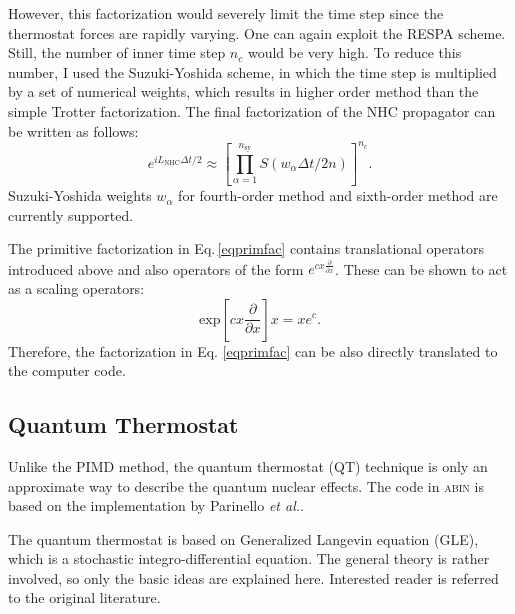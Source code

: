 However, this factorization would severely limit the time step since the thermostat forces are rapidly varying. One can again exploit the RESPA scheme. Still, the number of inner time step $n_c$ would be very high. To reduce this number, I used the Suzuki-Yoshida scheme\cite{Yoshida1990}, in which the time step is multiplied by a set of numerical weights, which results in higher order method than the simple Trotter factorization. 
The final factorization of the NHC propagator can be written as follows:
\begin{equation}
e^{iL_{\mathrm{NHC}}\Delta t/2} \approx \left[ \prod_{\alpha=1}^{n_{\mathrm{sy}}}S(w_\alpha\Delta t/2n) \right]^{n_c}   .
\end{equation}
Suzuki-Yoshida weights $w_\alpha$ for fourth-order method and sixth-order method are currently supported.

The primitive factorization in Eq.\,\ref{eqprimfac} contains translational operators introduced above and also operators of the form $e^{cx\frac{\partial}{\partial x}}$. These can be shown to act as a scaling operators:
\begin{equation}
\mathrm{exp}\left[cx\frac{\partial}{\partial x}\right] x = xe^c  .
\end{equation}
Therefore, the factorization in Eq. \ref{eqprimfac} can be also directly translated to the computer code.

\newpage
\subsection{Quantum Thermostat}
Unlike the PIMD method, the quantum thermostat (QT) technique is only an approximate way to describe the quantum nuclear effects. The code in \textsc{abin} is based on the implementation by Parinello \textit{et al.}\cite{Ceriotti2010d}.

The quantum thermostat is based on Generalized Langevin equation (GLE), which is a stochastic integro-differential equation. The general theory is rather involved, so only the basic ideas are explained here. Interested reader is referred to the original literature\cite{Ceriotti2010d}.

